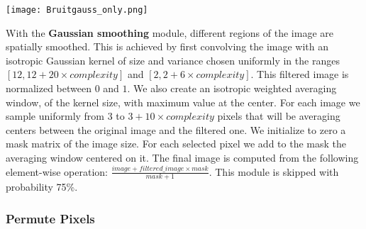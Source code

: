 \documentclass{article} %
\begin{document}
\begin{minipage}[t]{0.14\linewidth}
\begin{center}
\vspace*{6mm}
\texttt{[image: Bruitgauss\_only.png]}
\end{center}
\end{minipage}%
\hspace{0.3cm}\begin{minipage}[t]{0.86\linewidth}
With the {\bf Gaussian smoothing} module, 
different regions of the image are spatially smoothed.
This is achieved  by first convolving
the image with an isotropic Gaussian kernel of
size and variance chosen uniformly in the ranges $[12,12 + 20 \times
complexity]$ and $[2,2 + 6 \times complexity]$. This filtered image is normalized
between $0$ and $1$.  We also create an isotropic weighted averaging window, of the
kernel size, with maximum value at the center.  For each image we sample
uniformly from $3$ to $3 + 10 \times complexity$ pixels that will be
averaging centers between the original image and the filtered one.  We
initialize to zero a mask matrix of the image size. For each selected pixel
we add to the mask the averaging window centered on it.  The final image is
computed from the following element-wise operation: $\frac{image + filtered\_image
\times mask}{mask+1}$.
This module is skipped with probability 75\%.
\end{minipage}


\subsubsection*{Permute Pixels}
\end{document}
